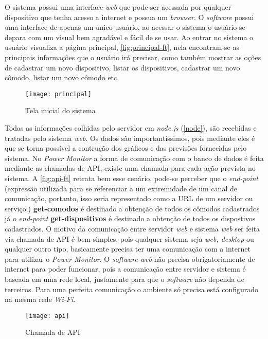 O sistema possui uma interface \textit{web} que pode ser acessada por qualquer dispositivo que tenha acesso a internet e possua um 
\textit{browser}. O \textit{software} possui uma interface de apenas um único usuário, ao acessar o sistema o usuário se depara com um
visual bem agradável e fácil de se usar. Ao entrar no sistema o usuário visualiza a página principal, \autoref{fig:principal-ft}, nela encontram-se
as principais informações que o usuário irá precisar, como também mostrar as oções de cadastrar um novo dispositivo, listar os dispositivos, cadastrar um novo cômodo,
listar um novo cômodo etc.

\begin{figure}[h!]
	\texttt{[image: principal]}
	\centering
	\caption[Tela inicial do sistema]{Tela inicial do sistema}
	\label{fig:principal-ft}
\end{figure}
\FloatBarrier

Todas as informações colhidas pelo servidor em \textit{node.js} (\autoref{node}), são recebidas e tratadas pelo sistema \textit{web}. Os dados
são importantíssimos, pois mediante eles é que se torna possível a contrução dos gráficos e das previsões fornecidas pelo sistema. No \textit{Power Monitor}
a forma de comunicação com o banco de dados é feita mediante as chamadas de API, existe uma chamada para cada ação prevista no sistema. A \autoref{fig:api-ft}
retrata bem esse cenário, pode-se perceber que o \textit{end-point} (expressão utilizada para se referenciar a um extremidade de um canal de comunicação, portanto, isso 
seria representado como a URL de um servidor ou serviço.) \textbf{get-comodos} é destinado a obtenção de todos os cômodos cadastrados já o \textit{end-point}
\textbf{get-dispositivos} é destinado a obtenção de todos os dispostivos cadastrados. O motivo da comunicação entre servidor \textit{web} e sistema \textit{web}
ser feita via chamada de API é bem simples, pois qualquer sistema seja \textit{web, desktop} ou qualquer outro tipo, basicamente precisa ter uma comunicação com a internet
para utilizar o \textit{Power Monitor}. O \textit{software web} não precisa obrigatoriamente de internet para poder funcionar, pois a comunicação entre servidor e sistema é
baseada em uma rede local, justamente para que o \textit{software} não dependa de terceiros. Para uma perfeita comunicação o ambiente só precisa está configurado
na mesma rede \textit{Wi-Fi}. 

\begin{figure}[h!]
	\texttt{[image: api]}
	\centering
	\caption[Chamada de API]{Chamada de API}
	\label{fig:api-ft}
\end{figure}
\FloatBarrier

